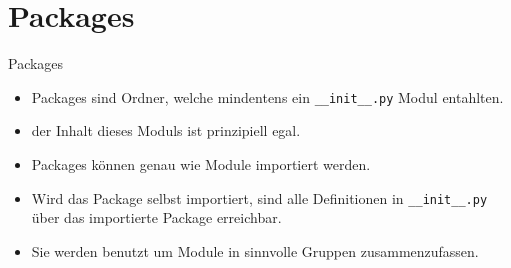 \section{Packages}
\begin{frame}{Packages}
	\begin{itemize}
		\item Packages sind Ordner, welche mindentens ein \texttt{\_\_init\_\_.py} Modul entahlten.
		\item der Inhalt dieses Moduls ist prinzipiell egal. 
		\item Packages können genau wie Module importiert werden.
		\item Wird das Package selbst importiert, sind alle Definitionen in \texttt{\_\_init\_\_.py} über das importierte Package erreichbar.
		\item Sie werden benutzt um Module in sinnvolle Gruppen zusammenzufassen.
	\end{itemize}
\end{frame}


